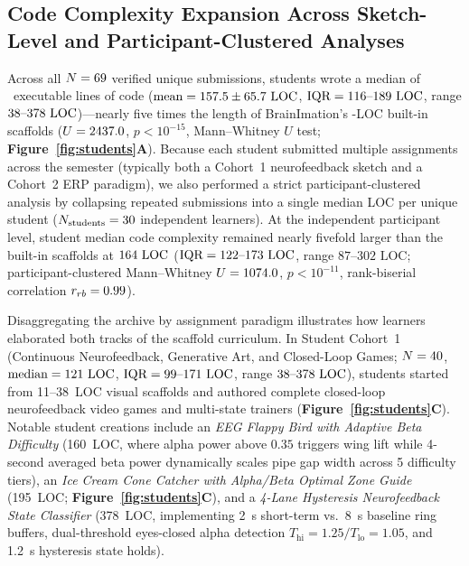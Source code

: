 \documentclass[10pt,twocolumn]{article}
\begin{document}
\subsection{Code Complexity Expansion Across Sketch-Level and Participant-Clustered Analyses}
Across all $N = 69$ verified unique submissions, students wrote a median of \StuLOCMedian~executable lines of code ($\text{mean} = 157.5 \pm 65.7\text{ LOC}$, $\text{IQR} = 116\text{--}189\text{ LOC}$, range $38\text{--}378\text{ LOC}$)---nearly five times the length of BrainImation's \ExLOCMedian-LOC built-in scaffolds ($U = 2437.0$, $p < 10^{-15}$, Mann--Whitney $U$ test; \textbf{Figure~\ref{fig:students}A}). Because each student submitted multiple assignments across the semester (typically both a Cohort~1 neurofeedback sketch and a Cohort~2 ERP paradigm), we also performed a strict participant-clustered analysis by collapsing repeated submissions into a single median LOC per unique student ($N_{\text{students}} = 30$ independent learners). At the independent participant level, student median code complexity remained nearly fivefold larger than the built-in scaffolds at $164\text{ LOC}$ ($\text{IQR} = 122\text{--}173\text{ LOC}$, range $87\text{--}302\text{ LOC}$; participant-clustered Mann--Whitney $U = 1074.0$, $p < 10^{-11}$, rank-biserial correlation $r_{rb} = 0.99$).

Disaggregating the archive by assignment paradigm illustrates how learners elaborated both tracks of the scaffold curriculum. In Student Cohort~1 (Continuous Neurofeedback, Generative Art, and Closed-Loop Games; $N = 40$, $\text{median} = 121\text{ LOC}$, $\text{IQR} = 99\text{--}171\text{ LOC}$, range $38\text{--}378\text{ LOC}$), students started from 11--38~LOC visual scaffolds and authored complete closed-loop neurofeedback video games and multi-state trainers (\textbf{Figure~\ref{fig:students}C}). Notable student creations include an \emph{EEG Flappy Bird with Adaptive Beta Difficulty} (160~LOC, where alpha power above $0.35$ triggers wing lift while 4-second averaged beta power dynamically scales pipe gap width across 5 difficulty tiers), an \emph{Ice Cream Cone Catcher with Alpha/Beta Optimal Zone Guide} (195~LOC; \textbf{Figure~\ref{fig:students}C}), and a \emph{4-Lane Hysteresis Neurofeedback State Classifier} (378~LOC, implementing 2~s short-term vs.\ 8~s baseline ring buffers, dual-threshold eyes-closed alpha detection $T_{\text{hi}}=1.25 / T_{\text{lo}}=1.05$, and 1.2~s hysteresis state holds).
\end{document}
